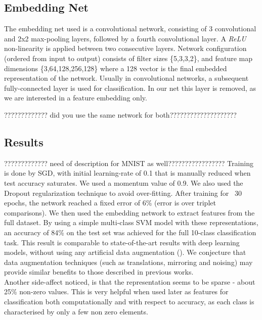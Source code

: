 \documentclass{article} %
\begin{document}
\subsection{Embedding Net}
The embedding net used is a convolutional network, consisting of 3 convolutional and 2x2 max-pooling layers, followed by a fourth convolutional layer. A \emph{ReLU} non-linearity is applied between two consecutive layers.
Network configuration (ordered from input to output) consists of filter sizes \{5,3,3,2\}, and feature map dimensions \{3,64,128,256,128\} where a 128 vector is the final embedded representation of the network. Usually in convolutional networks, a subsequent fully-connected
layer is used for classification. In our net this layer is removed, as we are interested in a feature embedding only.


????????????? did you use the same network for both????????????????????

\subsection{Results}
????????????? need of description for MNIST as well?????????????????
Training is done by SGD, with initial learning-rate of 0.1 that is manually reduced when test accuracy saturates. We used a momentum value of 0.9. We also used the Dropout regularization technique to avoid over-fitting.
After training for ~30 epochs, the network reached a fixed error of 6\% (error is over triplet comparisons). We then used the embedding network to extract features from the full dataset. By using a simple multi-class SVM model with these representations, an accuracy of 84\% on the test set was achieved for the full 10-class classification task.
This result is comparable to state-of-the-art results with deep learning models, without using any artificial data augmentation (\citet{zeiler2013stochastic,goodfellow2013maxout,LinCY13}). We conjecture that data augmentation techniques (such as translations, mirroring and noising) may provide similar benefits to those described in previous works.\\
Another side-affect noticed, is that the representation seems to be sparse - about 25\% non-zero values. This is very helpful when used later as features for classification both computationally and with respect to accuracy, as each class is characterised by only a few non zero elements.
\end{document}
